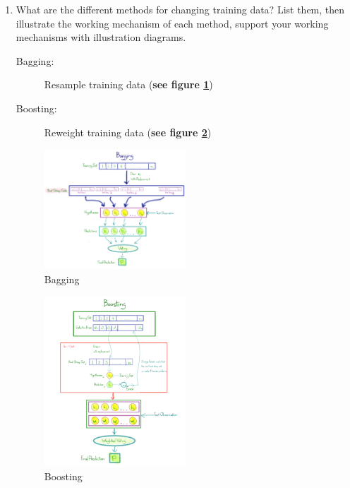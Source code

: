 \documentclass[12pt]{article}
\newenvironment{QandA}{\begin{enumerate}[label=\bfseries\arabic*.]\bfseries}
{\end{enumerate}}
\newenvironment{answered}{\par\normalfont\color{Sepia}}{}
\begin{document}
\begin{QandA}
    \item What are the different methods for changing training data? List them, then illustrate 
          the working mechanism of each method, support your working mechanisms with illustration diagrams.
    \begin{answered}
        \begin{description}
            \item[Bagging:] Resample training data (\textbf{see figure \ref{fig:bagging}})
            \item[Boosting:] Reweight training data (\textbf{see figure \ref{fig:boosting}})
        \end{description}
        \begin{figure}[H]
            \centering
            \includegraphics[width=0.5\textwidth]{bagging.png}
            \caption{Bagging}
            \label{fig:bagging}
        \end{figure}

        \begin{figure}[H]
            \centering
            \includegraphics[width=0.5\textwidth]{boosting.png}
            \caption{Boosting}
            \label{fig:boosting}
        \end{figure}
    \end{answered}


\end{QandA}
\end{document}
